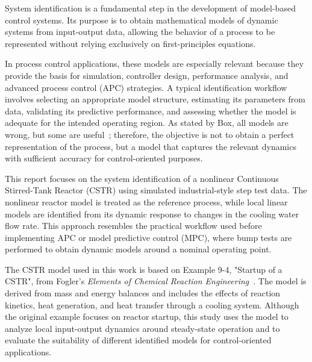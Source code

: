 System identification is a fundamental step in the development of model-based control systems. Its purpose is to obtain mathematical models of dynamic systems from input-output data, allowing the behavior of a process to be represented without relying exclusively on first-principles equations.

In process control applications, these models are especially relevant because they provide the basis for simulation, controller design, performance analysis, and advanced process control (APC) strategies. A typical identification workflow involves selecting an appropriate model structure, estimating its parameters from data, validating its predictive performance, and assessing whether the model is adequate for the intended operating region. As stated by Box, all models are wrong, but some are useful~\cite{box1976science}; therefore, the objective is not to obtain a perfect representation of the process, but a model that captures the relevant dynamics with sufficient accuracy for control-oriented purposes.

This report focuses on the system identification of a nonlinear Continuous Stirred-Tank Reactor (CSTR) using simulated industrial-style step test data. The nonlinear reactor model is treated as the reference process, while local linear models are identified from its dynamic response to changes in the cooling water flow rate. This approach resembles the practical workflow used before implementing APC or model predictive control (MPC), where bump tests are performed to obtain dynamic models around a nominal operating point.

The CSTR model used in this work is based on Example 9-4, "Startup of a CSTR", from Fogler's \textit{Elements of Chemical Reaction Engineering}~\cite{fogler}. The model is derived from mass and energy balances and includes the effects of reaction kinetics, heat generation, and heat transfer through a cooling system. Although the original example focuses on reactor startup, this study uses the model to analyze local input-output dynamics around steady-state operation and to evaluate the suitability of different identified models for control-oriented applications.